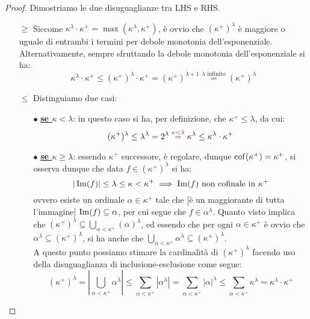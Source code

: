 \begin{proof}
	Dimostriamo le due disuguaglianze tra LHS e RHS.
	\begin{itemize}
		\item[$\boxed{\geq}$] Siccome $\kappa^{\lambda} \cdot \kappa^+ = \max(\kappa^{\lambda}, \kappa^+)$, è ovvio che $(\kappa^+)^\lambda$ è maggiore o uguale di entrambi i termini per debole monotonia dell'esponenziale. Alternativamente, sempre sfruttando la debole monotonia dell'esponenziale si ha:
		\[ \kappa^\lambda \cdot \kappa^+ \leq (\kappa^+)^{\lambda} \cdot \kappa^+ = (\kappa^+)^{\lambda + 1} \overset{\text{$\lambda$ infinito}}{=}(\kappa^+)^{\lambda}
			\]
		\item[$\boxed{\leq}$] Distinguiamo due casi:
		\begin{itemize}
			\item[$\bullet$]\textbf{\underline{se $\kappa < \lambda$}}: in questo caso si ha, per definizione, che $\kappa^+ \leq \lambda$, da cui:
			\[ (\kappa^+)^\lambda \leq \lambda^\lambda = 2^{\lambda} \overset{\textcolor{purple}{\kappa < \lambda}}{=} \kappa^{\lambda} \leq \kappa^{\lambda}\cdot \kappa^+
				\]
			\item[$\bullet$]\textbf{\underline{se $\kappa \geq \lambda$}}: essendo $\kappa^+$ successore, è regolare, dunque $\operatorname{cof}(\kappa^+) = \kappa^+$, si osserva dunque che data $f \in (\kappa^+)^\lambda$ si ha:
			\[ |\operatorname{Im}(f)| \leq \lambda \leq \kappa < \kappa^{+} \implies \text{$\operatorname{Im}(f)$ non cofinale in $\kappa^+$}
				\]
			ovvero esiste un ordinale $\alpha \in \kappa^+$ tale che [è un maggiorante di tutta l'immagine] $\operatorname{Im}(f) \subseteq \alpha$, per cui segue che $f \in \alpha^\lambda$. Quanto visto implica che $(\kappa^+)^\lambda \subseteq \bigcup_{\alpha < \kappa^+}(\alpha)^\lambda$, ed essendo che 
			per ogni $\alpha \in \kappa^+$ è ovvio che $\alpha^{\lambda} \subseteq (\kappa^+)^\lambda$, si ha anche che $\bigcup_{\alpha < \kappa^+} \alpha^\lambda \subseteq (\kappa^+)^\lambda$.\\
			A questo punto possiamo stimare la cardinalità di $(\kappa^+)^\lambda$ facendo uso della disuguaglianza di inclusione-esclusione come segue:
			\[ (\kappa^+)^\lambda = \left\lvert \bigcup_{\alpha < \kappa^+} \alpha^{\lambda}\right\rvert \leq \sum_{\alpha < \kappa^+} |\alpha^{\lambda}| = \sum_{\alpha < \kappa^+} |\alpha|^{\lambda} \leq \sum_{\alpha < \kappa^+} \kappa^{\lambda} = \kappa^{\lambda} \cdot \kappa^+
				\]
		\end{itemize}
	\end{itemize}
\end{proof}

